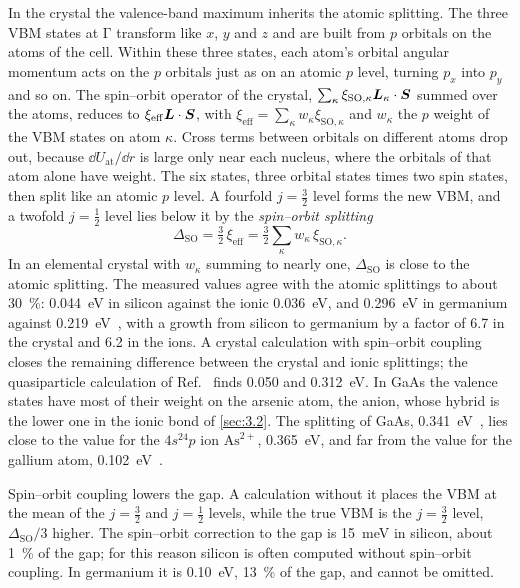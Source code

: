 In the crystal the valence-band maximum inherits the atomic splitting. The three VBM states at $\mathrm{\Gamma}$ transform like $x$, $y$ and $z$ and are built from $p$ orbitals on the atoms of the cell. Within these three states, each atom's orbital angular momentum acts on the $p$ orbitals just as on an atomic $p$ level, turning $p_x$ into $p_y$ and so on. The spin--orbit operator of the crystal, $\sum_\kappa\xi_{\mathrm{SO},\kappa}\bm{L}_\kappa\cdot\bm{S}$ summed over the atoms, reduces to $\xi_{\mathrm{eff}}\bm{L}\cdot\bm{S}$, with $\xi_{\mathrm{eff}} = \sum_\kappa w_\kappa\xi_{\mathrm{SO},\kappa}$ and $w_\kappa$ the $p$ weight of the VBM states on atom $\kappa$. Cross terms between orbitals on different atoms drop out, because $\dd U_{\mathrm{at}}/\dd r$ is large only near each nucleus, where the orbitals of that atom alone have weight. The six states, three orbital states times two spin states, then split like an atomic $p$ level. A fourfold $j = \frac32$ level forms the new VBM, and a twofold $j = \frac12$ level lies below it by the \emph{spin--orbit splitting}
\begin{equation}
  \Delta_{\mathrm{SO}} = \tfrac32\,\xi_{\mathrm{eff}} = \tfrac32\sum_\kappa w_\kappa\,\xi_{\mathrm{SO},\kappa} .
  \label{eq:3.3-DSO}
\end{equation}
In an elemental crystal with $w_\kappa$ summing to nearly one, $\Delta_{\mathrm{SO}}$ is close to the atomic splitting. The measured values agree with the atomic splittings to about \SI{30}{\percent}: \SI{0.044}{eV} in silicon against the ionic \SI{0.036}{eV}, and \SI{0.296}{eV} in germanium against \SI{0.219}{eV}~\cite[Table~II]{rideau2006strained}, with a growth from silicon to germanium by a factor of 6.7 in the crystal and 6.2 in the ions. A crystal calculation with spin--orbit coupling closes the remaining difference between the crystal and ionic splittings; the quasiparticle calculation of Ref.~\cite[Table~II]{rideau2006strained} finds 0.050 and \SI{0.312}{eV}. In GaAs the valence states have most of their weight on the arsenic atom, the anion, whose hybrid is the lower one in the ionic bond of \cref{sec:3.2}. The splitting of GaAs, \SI{0.341}{eV}~\cite{vurgaftman2001band}, lies close to the value for the $4s^24p$ ion $\mathrm{As}^{2+}$, \SI{0.365}{eV}, and far from the value for the gallium atom, \SI{0.102}{eV}~\cite{kramida2024nist}.

Spin--orbit coupling lowers the gap. A calculation without it places the VBM at the mean of the $j = \frac32$ and $j = \frac12$ levels, while the true VBM is the $j = \frac32$ level, $\Delta_{\mathrm{SO}}/3$ higher. The spin--orbit correction to the gap is \SI{15}{meV} in silicon, about \SI{1}{\percent} of the gap; for this reason silicon is often computed without spin--orbit coupling. In germanium it is \SI{0.10}{eV}, \SI{13}{\percent} of the gap, and cannot be omitted.

